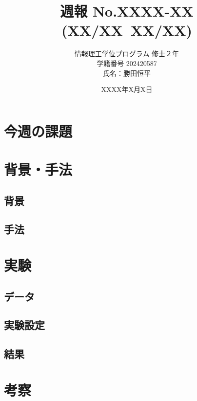 \documentclass{article}
\title{\vspace{-3cm}週報 No.XXXX-XX (XX/XX~XX/XX)}
\author{情報理工学位プログラム 修士２年\\ 学籍番号 202420587 \\氏名：勝田恒平}
\date{XXXX年X月X日}
\begin{document}
\maketitle

\section{今週の課題}

\section{背景・手法}
\subsection{背景}

\subsection{手法}

\section{実験}
\subsection{データ}

\subsection{実験設定}

\subsection{結果}

\section{考察}

\printbibliography[title={参考文献}]
\end{document}
